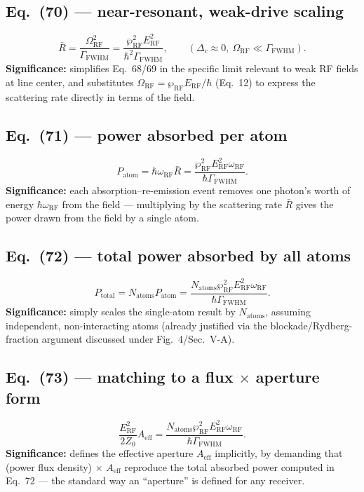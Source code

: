 \documentclass[11pt]{article}
\begin{document}
\subsection*{Eq.~(70) --- near-resonant, weak-drive scaling}
\begin{equation}
\bar R = \frac{\Omega_\text{RF}^2}{\Gamma_\text{FWHM}} = \frac{\wp_\text{RF}^2E_\text{RF}^2}{\hbar^2\Gamma_\text{FWHM}}, \qquad (\Delta_c\approx0,\ \Omega_\text{RF}\ll\Gamma_\text{FWHM}). \tag{70}
\end{equation}
\textbf{Significance:} simplifies Eq.~68/69 in the specific limit
relevant to weak RF fields at line center, and substitutes
$\Omega_\text{RF}=\wp_\text{RF}E_\text{RF}/\hbar$ (Eq.~12) to express the
scattering rate directly in terms of the field.

\subsection*{Eq.~(71) --- power absorbed per atom}
\begin{equation}
P_\text{atom} = \hbar\omega_\text{RF}\bar R = \frac{\wp_\text{RF}^2E_\text{RF}^2\omega_\text{RF}}{\hbar\Gamma_\text{FWHM}}. \tag{71}
\end{equation}
\textbf{Significance:} each absorption--re-emission event removes one
photon's worth of energy $\hbar\omega_\text{RF}$ from the field ---
multiplying by the scattering rate $\bar R$ gives the power drawn from
the field by a single atom.

\subsection*{Eq.~(72) --- total power absorbed by all atoms}
\begin{equation}
P_\text{total} = N_\text{atoms}P_\text{atom} = \frac{N_\text{atoms}\wp_\text{RF}^2E_\text{RF}^2\omega_\text{RF}}{\hbar\Gamma_\text{FWHM}}. \tag{72}
\end{equation}
\textbf{Significance:} simply scales the single-atom result by
$N_\text{atoms}$, assuming independent, non-interacting atoms (already
justified via the blockade/Rydberg-fraction argument discussed under
Fig.~4/Sec.~V-A).

\subsection*{Eq.~(73) --- matching to a flux $\times$ aperture form}
\begin{equation}
\frac{E_\text{RF}^2}{2Z_0}A_\text{eff} = \frac{N_\text{atoms}\wp_\text{RF}^2E_\text{RF}^2\omega_\text{RF}}{\hbar\Gamma_\text{FWHM}}. \tag{73}
\end{equation}
\textbf{Significance:} defines the effective aperture $A_\text{eff}$
implicitly, by demanding that (power flux density) $\times$
$A_\text{eff}$ reproduce the total absorbed power computed in Eq.~72 ---
the standard way an ``aperture'' is defined for any receiver.
\end{document}
